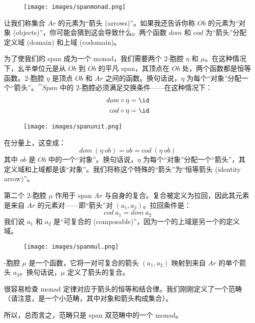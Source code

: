\begin{figure}[H]
  \centering
  \texttt{[image: images/spanmonad.png]}
\end{figure}

\noindent
让我们称集合 $\mathit{Ar}$ 的元素为“箭头 (arrows)”。如果我还告诉你称 $\mathit{Ob}$ 的元素为“对象 (objects)”，你可能会猜到这会导致什么。两个函数 $\mathit{dom}$ 和 $\mathit{cod}$ 为“箭头”分配定义域 (domain) 和上域 (codomain)。

为了使我们的 span 成为一个 monad，我们需要两个 2-胞腔 $\eta$ 和 $\mu$。在这种情况下，幺半单位元是从 $\mathit{Ob}$ 到 $\mathit{Ob}$ 的平凡 span，其顶点在 $\mathit{Ob}$ 处，两个函数都是恒等函数。2-胞腔 $\eta$ 是顶点 $\mathit{Ob}$ 和 $\mathit{Ar}$ 之间的函数。换句话说，$\eta$ 为每个“对象”分配一个“箭头”。$\cat{Span}$ 中的 2-胞腔必须满足交换条件——在这种情况下：
\begin{align*}
  \mathit{dom} & \circ \eta = \id \\
  \mathit{cod} & \circ \eta = \id
\end{align*}

\begin{figure}[H]
  \centering
  \texttt{[image: images/spanunit.png]}
\end{figure}

\noindent
在分量上，这变成：
\[\mathit{dom}\ (\eta\ \mathit{ob}) = \mathit{ob} = \mathit{cod}\ (\eta\ \mathit{ob})\]
其中 $\mathit{ob}$ 是 $\mathit{Ob}$ 中的一个“对象”。换句话说，$\eta$ 为每个“对象”分配一个“箭头”，其定义域和上域都是该“对象”。我们将称这个特殊的“箭头”为“恒等箭头 (identity arrow)”。

第二个 2-胞腔 $\mu$ 作用于 span $\mathit{Ar}$ 与自身的复合。复合被定义为拉回，因此其元素是来自 $\mathit{Ar}$ 的元素对——即“箭头”对 $(a_1, a_2)$。拉回条件是：
\[\mathit{cod}\ a_1 = \mathit{dom}\ a_2\]
我们说 $a_1$ 和 $a_2$ 是“可复合的 (composable)”，因为一个的上域是另一个的定义域。

\begin{figure}[H]
  \centering
  \texttt{[image: images/spanmul.png]}
\end{figure}

-胞腔 $\mu$ 是一个函数，它将一对可复合的箭头 $(a_1, a_2)$ 映射到来自 $\mathit{Ar}$ 的单个箭头 $a_3$。换句话说，$\mu$ 定义了箭头的复合。

很容易检查 monad 定律对应于箭头的恒等和结合律。我们刚刚定义了一个范畴（请注意，是一个小范畴，其中对象和箭头构成集合）。

所以，总而言之，范畴只是 span 双范畴中的一个 monad。

